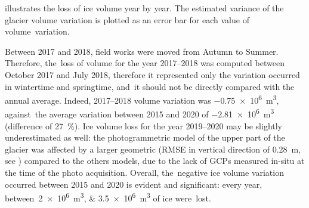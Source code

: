  illustrates the loss of ice volume year by year.
The estimated variance of the glacier volume variation is plotted as an error bar for
each value of volume~variation.

Between 2017 and 2018, field works were moved from Autumn to Summer.
Therefore, the~loss of volume for the year 2017--2018 was computed between October 2017
and July 2018, therefore it represented only the variation occurred in wintertime and
springtime, and~it should not be directly compared with the annual average.
Indeed, 2017--2018 volume variation was \SI{-0.75e6}{\cubic\meter}, against~the average
variation between 2015 and 2020 of \SI{-2.81e6}{\cubic\meter} (difference of
\SI{27}{\percent}).
Ice volume loss for the year 2019--2020 may be slightly underestimated as well: the
photogrammetric model of the upper part of the glacier was affected by a larger geometric
(RMSE in vertical direction of \SI{0.28}{\meter}, see )
compared to the others models, due to the lack of GCPs measured in-situ at the time of
the photo acquisition.
Overall, the~negative ice volume variation occurred between 2015 and 2020 is evident and
significant: every year, between~\SIlist{2e6;3.5e6}{\cubic\meter} of ice were~lost.

